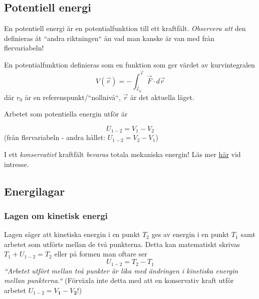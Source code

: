 \documentclass{article}
\newenvironment{ankiflashcard}[1]{}{}
\begin{document}
\begin{paracol}{2}
\begin{ankiflashcard}{Definiera potentiell energi}
\subsection{Potentiell energi}
En potentiell energi är en potentialfunktion till ett kraftfält. \textit{Observera att} den definieras åt ``andra riktningen`` än vad man kanske är van med från flervariabeln!


En potentialfunktion definieras som en funktion som ger värdet av kurvintegralen
$$
V(\boxed{\vec r}) = \mathbf{-}\int_{\vec r_0}^{\boxed{\vec r}} \vec F \cdot d\vec r 
$$
där $r_0$ är en referenspunkt/``nollnivå``, $\vec r$ är det aktuella läget.

Arbetet som potentiella energin utför är

$$
U_{1-2} = V_1 - V_2
$$
(från flervariabeln - andra hållet: $U_{1-2}=V_2-V_1$)
\end{ankiflashcard}



\begin{ankiflashcard}{Hur förhåller sig totala mekaniska energin i ett konservativt kraftfält?}
I ett \textit{konservativt} kraftfält \textit{bevaras} totala mekaniska energin! Läs mer \href{https://physics-chalmers.github.io/ffm234/doc/pub/08-potentialteori/html/08-potentialteori-bs.html}{här} vid intresse.
\end{ankiflashcard}
\subsection{Energilagar}

\begin{ankiflashcard}{Formulera lagen om kinetisk energi}
\subsubsection{Lagen om kinetisk energi}
Lagen säger att kinetiska energin i en punkt $T_2$ ges av energin i en punkt $T_1$ samt arbetet som utförts mellan de två punkterna. Detta kan matematiskt skrivas $T_1 + U_{1-2} = T_2$ eller på formen man oftare ser
$$
U_{1-2} = T_2 - T_1
$$
\textit{``Arbetet utfört mellan två punkter är lika med ändringen i kinetiska energin mellan punkterna.``}
(Förväxla inte detta med att en konservativ kraft utför arbetet $U_{1-2}=V_{\mathbf 1}-V_{\mathbf 2}$!)
\end{ankiflashcard}


\end{paracol}
\end{document}
